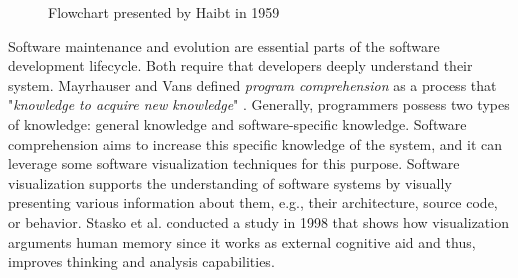 \begin{figure}
  \caption{Flowchart presented by Haibt in 1959}
  \label{fig:Haibt1959_Flowchart}

\end{figure}

Software maintenance and evolution are essential parts of the software development lifecycle. Both require that developers deeply understand their system. 
Mayrhauser and Vans defined {\it program comprehension} as a process that "{\it knowledge to acquire new knowledge}" \cite{VonMayrhauser1995}. 
Generally, programmers possess two types of knowledge: general knowledge and software-specific knowledge. 
Software comprehension aims to increase this specific knowledge of the system, and it can leverage some software visualization techniques for this purpose. 
Software visualization supports the understanding of software systems
by visually presenting various information about them, e.g., their architecture, source code, or behavior.
Stasko et al.\cite{Stasko2008} conducted a study in 1998 that shows how visualization arguments human memory since 
it works as external cognitive aid and thus, improves thinking and analysis capabilities.

\bigbreak

